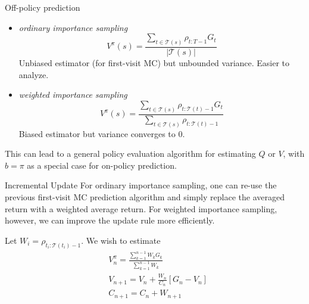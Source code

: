 \documentclass[handout]{beamer}
\begin{document}
\begin{frame}{Off-policy prediction}
\small

\begin{itemize}[<+(1)->]
	\item \textit{ordinary importance sampling} $$V^{\pi}(s) = \frac{\sum_{t\in\mathcal{T}(s)} \rho_{t:T-1}G_t}{|\mathcal{T}(s)|}
 $$
 Unbiased estimator (for first-visit MC) but unbounded variance. Easier to analyze.
	\item \textit{weighted importance sampling} $$V^{\pi}(s) = \frac{\sum_{t\in\mathcal{T}(s)} \rho_{t:\mathcal{T}(t)-1} G_t}{\sum_{t\in\mathcal{T}(s)}\rho_{t:\mathcal{T}(t)-1}}
 $$
 Biased estimator but variance converges to $0$.

\end{itemize}
This can lead to a general policy evaluation algorithm for estimating $Q$ or $V$, with $b=\pi$ as a special case for on-policy prediction.
\end{frame}

\begin{frame}{Incremental Update}
	\small
	For ordinary importance sampling, one can re-use the previous first-visit MC prediction algorithm and simply replace the averaged return with a weighted average return. For weighted importance sampling, however, we can improve the update rule more efficiently.
	
	Let $W_i = \rho_{t_i:\mathcal{T}(t_i)-1}$. We wish to estimate 
	\begin{align*}
	&V^{\pi}_n = \frac{\sum^{n-1}_{k=1} W_k G_k}{\sum^{n-1}_{k=1}W_k} \\
	&V_{n+1} = V_n + \frac{W_n}{C_n} [G_n - V_n]\\
	&C_{n+1} = C_n + W_{n+1}	
	\end{align*}
\end{frame}
\end{document}
